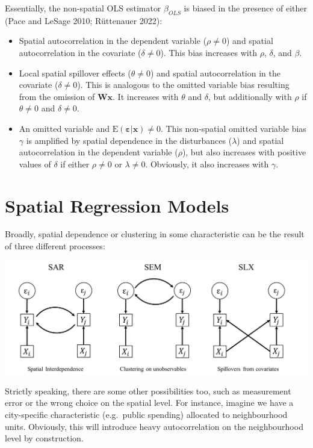 \documentclass[
  letterpaper,
]{scrbook}
\begin{document}
Essentially, the non-spatial OLS estimator \(\beta_{OLS}\) is biased in
the presence of either (Pace and LeSage 2010; Rüttenauer 2022):

\begin{itemize}
\item
  Spatial autocorrelation in the dependent variable (\(\rho\neq0\)) and
  spatial autocorrelation in the covariate (\(\delta\neq0\)). This bias
  increases with \(\rho\), \(\delta\), and \(\beta\).
\item
  Local spatial spillover effects (\(\theta\neq0\)) and spatial
  autocorrelation in the covariate (\(\delta\neq0\)). This is analogous
  to the omitted variable bias resulting from the omission of
  \({\boldsymbol{\mathbf{W}}} {\boldsymbol{\mathbf{x}}}\). It increases
  with \(\theta\) and \(\delta\), but additionally with \(\rho\) if
  \(\theta\neq0\) and \(\delta\neq0\).
\item
  An omitted variable and
  \(\mathrm{E}({\boldsymbol{\mathbf{\varepsilon}}}|{\boldsymbol{\mathbf{x}}})\neq0\).
  This non-spatial omitted variable bias \(\gamma\) is amplified by
  spatial dependence in the disturbances (\(\lambda\)) and spatial
  autocorrelation in the dependent variable (\(\rho\)), but also
  increases with positive values of \(\delta\) if either \(\rho\neq 0\)
  or \(\lambda\neq 0\). Obviously, it also increases with \(\gamma\).
\end{itemize}

\hypertarget{spatial-regression-models-1}{%
\section{Spatial Regression Models}\label{spatial-regression-models-1}}

Broadly, spatial dependence or clustering in some characteristic can be
the result of three different processes:

\includegraphics{fig/Graph.jpg}

Strictly speaking, there are some other possibilities too, such as
measurement error or the wrong choice on the spatial level. For
instance, imagine we have a city-specific characteristic (e.g.~public
spending) allocated to neighbourhood units. Obviously, this will
introduce heavy autocorrelation on the neighbourhood level by
construction.
\end{document}
